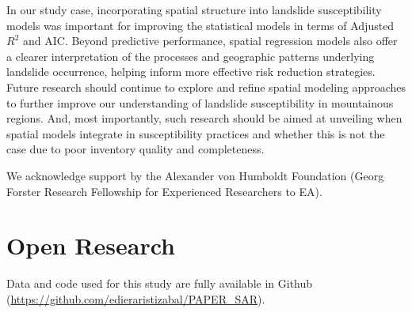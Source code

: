 \documentclass[lineno,pdflatex,sn-basic]{sn-jnl}%
\theoremstyle{thmstyleone}%
\theoremstyle{thmstyletwo}%
\theoremstyle{thmstylethree}%
\begin{document}
In our study case, incorporating spatial structure into landslide susceptibility models was important for improving the statistical models in terms of Adjusted $R^2$ and AIC. 
Beyond predictive performance, spatial regression models also offer a clearer interpretation of the processes and geographic patterns underlying landslide occurrence, helping inform more effective risk reduction strategies.
Future research should continue to explore and refine spatial modeling approaches to further improve our understanding of landslide susceptibility in mountainous regions. 
And, most importantly, such research should be aimed at unveiling when spatial models integrate in susceptibility practices and whether this is not the case due to poor inventory quality and completeness.

We acknowledge support by the Alexander von Humboldt Foundation (Georg Forster Research Fellowship for Experienced Researchers to EA).


\section{Open Research}
Data and code used for this study are fully available in Github (\url{https://github.com/edieraristizabal/PAPER_SAR}).



\end{document}
